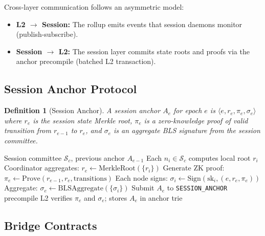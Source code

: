 \documentclass[11pt,a4paper]{article}
\newtheorem{definition}{Definition}[section]
\begin{document}
Cross-layer communication follows an asymmetric model:

\begin{itemize}
    \item \textbf{L2 $\to$ Session:} The rollup emits events that session
    daemons monitor (publish-subscribe).

    \item \textbf{Session $\to$ L2:} The session layer commits state roots
    and proofs via the anchor precompile (batched L2 transaction).
\end{itemize}

\subsection{Session Anchor Protocol}

\begin{definition}[Session Anchor]
    A session anchor $A_e$ for epoch $e$ is
    $\langle e, r_e, \pi_e, \sigma_e \rangle$
    where $r_e$ is the session state Merkle root, $\pi_e$ is a
    zero-knowledge proof of valid transition from $r_{e-1}$ to $r_e$, and
    $\sigma_e$ is an aggregate BLS signature from the session committee.
\end{definition}

\begin{algorithm}[H]
\caption{Session Anchor Commitment}
\label{alg:anchor-commit}
\begin{algorithmic}[1]
\Require Session committee $\mathcal{S}_c$, previous anchor $A_{e-1}$
\State Each $n_i \in \mathcal{S}_c$ computes local root $r_i$
\State Coordinator aggregates:
       $r_e \gets \mathrm{MerkleRoot}(\{r_i\})$
\State Generate ZK proof:
       $\pi_e \gets \mathrm{Prove}(r_{e-1}, r_e, \mathrm{transitions})$
\State Each node signs:
       $\sigma_i \gets \mathrm{Sign}(\mathrm{sk}_i, (e, r_e, \pi_e))$
\State Aggregate:
       $\sigma_e \gets \mathrm{BLSAggregate}(\{\sigma_i\})$
\State Submit $A_e$ to \texttt{SESSION\_ANCHOR} precompile
\State L2 verifies $\pi_e$ and $\sigma_e$; stores $A_e$ in anchor trie
\end{algorithmic}
\end{algorithm}

\subsection{Bridge Contracts}
\end{document}
